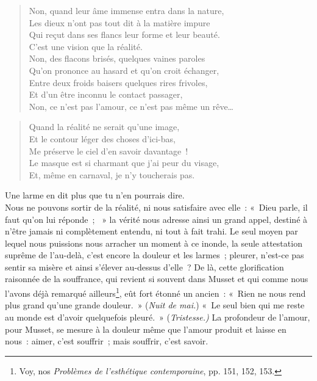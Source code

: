 \documentclass[french,twoside]{book} %
\def\mednobreak{\ifdim\lastskip<\medskipamount
  \removelastskip\nopagebreak\medskip\fi}
\newcommand{\labelblock}[1]{\medbreak{\noindent\color{rubric}\bfseries #1}\par\mednobreak}
\newenvironment{quoteblock}%
  {\begin{quoting}}
  {\end{quoting}}
\newenvironment{quotebar}{%
    \def\FrameCommand{{\color{rubric!10!}\vrule width 0.5em} \hspace{0.9em}}%
    \def\OuterFrameSep{\itemsep} %
    \MakeFramed {\advance\hsize-\width \FrameRestore}
  }%
  {%
    \endMakeFramed
  }
\renewenvironment{quoteblock}%
  {%
    \savenotes
    \setstretch{0.9}
    \normalfont
    \begin{quotebar}
  }
  {%
    \end{quotebar}
    \spewnotes
  }
\begin{document}
\begin{verse}
Non, quand leur âme immense entra dans la nature,\\
Les dieux n’ont pas tout dit à la matière impure\\
Qui reçut dans ses flancs leur forme et leur beauté.\\
C’est une vision que la réalité.\\
Non, des flacons brisés, quelques vaines paroles\\
Qu’on prononce au hasard et qu’on croit échanger,\\
Entre deux froids baisers quelques rires frivoles,\\
Et d’un être inconnu le contact passager,\\
Non, ce n’est pas l’amour, ce n’est pas même un rêve…\\
\end{verse}
\begin{quoteblock}

\labelblock{RODOLPHE}

\end{quoteblock}

\begin{verse}
Quand la réalité ne serait qu’une image,\\
Et le contour léger des choses d’ici-bas,\\
Me préserve le ciel d’en savoir davantage !\\
Le masque est si charmant que j’ai peur du visage,\\
Et, même en carnaval, je n’y toucherais pas.\\
\end{verse}
\begin{quoteblock}

\labelblock{ALBERT}

\end{quoteblock}
Une larme en dit plus que tu n’en pourrais dire.\\

\noindent Nous ne pouvons sortir de la réalité, ni nous satisfaire avec elle : « Dieu parle, il faut qu’on lui réponde ;  » la vérité nous adresse ainsi un grand appel, destiné à n’être jamais ni complètement entendu, ni tout à fait trahi. Le seul moyen par lequel nous puissions nous arracher un moment à ce inonde, la seule attestation suprême de l’au-delà, c’est encore la douleur et les larmes ; pleurer, n’est-ce pas sentir sa misère et ainsi s’élever au-dessus d’elle ? De là, cette glorification raisonnée de la souffrance, qui revient si souvent dans Musset et qui comme nous l’avons déjà remarqué ailleurs\footnote{ Voy, nos \emph{Problèmes de l’esthétique contemporaine}, pp. 151, 152, 153.}, eût fort étonné un ancien : « Rien ne nous rend plus grand qu’une grande douleur. » (\emph{Nuit de mai.}) « Le seul bien qui me reste au monde est d’avoir quelquefois pleuré. » (\emph{Tristesse.)} La profondeur de l’amour, pour Musset, se mesure à la douleur même que l’amour produit et laisse en nous : aimer, c’est souffrir ; mais souffrir, c’est savoir.\par
\end{document}
